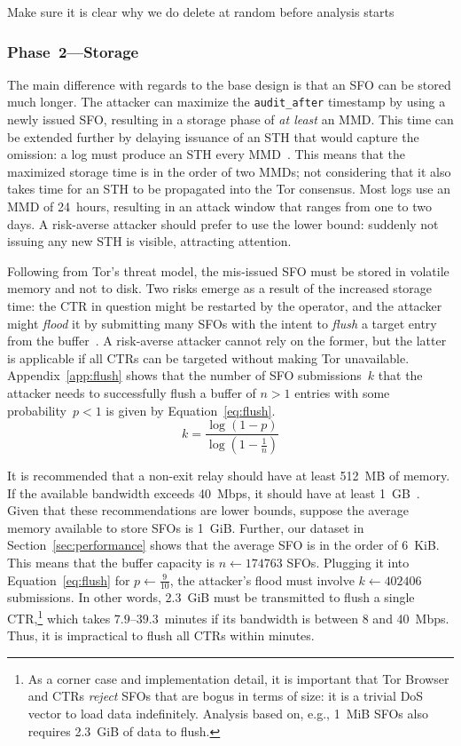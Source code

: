 Make sure it is clear why we do delete at random before analysis starts

\subsubsection{Phase~2---Storage} \label{sec:auditor:analysis:phase2}
The main difference with regards to the base design is that an SFO can be
stored much longer.  The attacker can maximize the \texttt{audit\_after}
timestamp by using a newly issued SFO, resulting in a storage phase of \emph{at
least} an MMD.  This time can be extended further by delaying issuance of an
STH that would capture the omission:
	a log must produce an STH every MMD~\cite{ct,ct/bis}.
This means that the maximized storage time is in the order of two MMDs; not
considering that it also takes time for an STH to be propagated into the Tor
consensus.  Most logs use an MMD of 24~hours, resulting in an attack window that
ranges from one to two days.  A risk-averse attacker should prefer to use the
lower bound:
	suddenly not issuing any new STH is visible, attracting attention.

Following from Tor's threat model, the mis-issued SFO must be stored in
volatile memory and not to disk.  Two risks emerge as a result of the increased
storage time:
	the CTR in question might be restarted by the operator,
	and the attacker might \emph{flood} it by submitting many SFOs with the
		intent to \emph{flush} a target entry from the buffer~\cite{nordberg}.
A risk-averse attacker cannot rely on the former, but the latter is applicable
if all CTRs can be targeted without making Tor unavailable.
Appendix~\ref{app:flush} shows that the number of SFO submissions~$k$
that the attacker needs to successfully flush a buffer of $n>1$ entries with
some probability~$p<1$ is given by Equation~\ref{eq:flush}.
\begin{equation} \label{eq:flush}
	k = \frac{\log(1-p)}{\log(1 - \frac{1}{n})}
\end{equation}

It is recommended that a non-exit relay should have at least 512~MB of memory.
If the available bandwidth exceeds 40~Mbps, it should have at least
1~GB~\cite{relay-config}.  Given that these recommendations are lower bounds,
suppose the average memory available to store SFOs is 1~GiB.  Further, our
dataset in Section~\ref{sec:performance} shows that the average SFO is in the
order of 6~KiB.  This means that the buffer capacity is $n \gets 174763$ SFOs.
Plugging it into Equation~\ref{eq:flush} for $p \gets \frac{9}{10}$, the
attacker's flood must involve $k \gets 402406$ submissions.  In other words,
2.3~GiB must be transmitted to flush a single CTR,\footnote{%
	As a corner case and implementation detail, it is important that Tor Browser
	and CTRs \emph{reject} SFOs that are bogus in terms of size:
		it is a trivial DoS vector to load data indefinitely.
	Analysis based on, e.g., 1~MiB SFOs also requires 2.3~GiB of data to flush.
} which takes $7.9$--$39.3$~minutes if its bandwidth is between 8 and 40~Mbps.
Thus, it is impractical to flush all CTRs within minutes.


